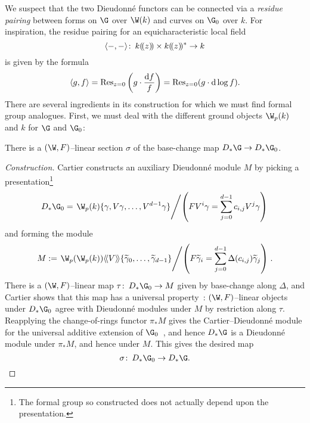 We suspect that the two Dieudonn\'e functors can be connected via a \textit{residue pairing} between forms on \(\G\) over \(\W(k)\) and curves on \(\G_0\) over \(k\).  For inspiration, the residue pairing for an equicharacteristic local field \[\langle-,-\rangle\colon\thinspace k(\!(z)\!) \times k(\!(z)\!)^* \to k\] is given by the formula \[\langle g, f\rangle = \operatorname{Res}_{z=0}\left(g \cdot \frac{\mathrm df}{f}\right) = \operatorname{Res}_{z=0}(g \cdot \mathrm d\log f).\]  There are several ingredients in its construction for which we must find formal group analogues.  First, we must deal with the different ground objects \(\W_p(k)\) and \(k\) for \(\G\) and \(\G_0\):
\begin{lemma}
There is a \((\W, F)\)--linear section \(\sigma\) of the base-change map \(D_* \G \to D_* \G_0\).
\end{lemma}
\begin{proof}[Construction]
Cartier constructs an auxiliary Dieudonn\'e module \(M\) by picking a presentation\footnote{The formal group so constructed does not actually depend upon the presentation.} \[D_* \G_0 = \left.\W_p(k)\{\gamma, V\gamma, \ldots, V^{d-1} \gamma\} \middle/ \left(F V^i \gamma = \sum_{j=0}^{d-1} c_{i,j} V^j \gamma\right) \right.\] and forming the module \[M := \left.\W_p(\W_p(k))\<\!\<V\>\!\>\{\widetilde\gamma_0, \ldots, \widetilde\gamma_{d-1}\} \middle/ \left(F \widetilde \gamma_i = \sum_{j=0}^{d-1} \Delta(c_{i,j}) \widetilde\gamma_j\right) \right. .\]  There is a \((\W, F)\)--linear map \(\tau\co D_* \G_0 \to M\) given by base-change along \(\Delta\), and Cartier shows that this map has a universal property~\cite[VII.2.9]{LazardCFGs}: \((\W, F)\)--linear objects under \(D_* \G_0\) agree with Dieudonn\'e modules under \(M\) by restriction along \(\tau\).  Reapplying the change-of-rings functor \(\pi_* M\) gives the Cartier--Dieudonn\'e module for the universal additive extension of \(\G_0\)~\cite[V.6.22 and VII.2.28]{LazardCFGs}, and hence \(D_* \G\) is a Dieudonn\'e module under \(\pi_* M\), and hence under \(M\).  This gives the desired map \[\sigma\co D_* \G_0 \to D_* \G. \qedhere\]
\end{proof}

